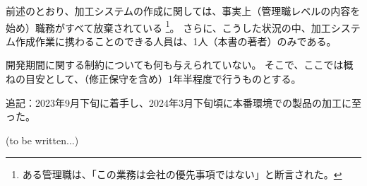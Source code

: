 




前述のとおり、加工システムの作成に関しては、事実上（管理職レベルの内容を始め）職務がすべて放棄されている
\footnote{ある管理職は、「この業務は会社の優先事項ではない」と断言された。}。
さらに、こうした状況の中、加工システム作成作業に携わることのできる人員は、1人（本書の著者）のみである。



開発期間に関する制約についても何も与えられていない。
そこで、ここでは概ねの目安として、（修正保守を含め）1年半程度で行うものとする。
\begin{marker}
追記：2023年9月下旬に着手し、2024年3月下旬頃に本番環境での製品の加工に至った。
\end{marker}



(to be written...)


